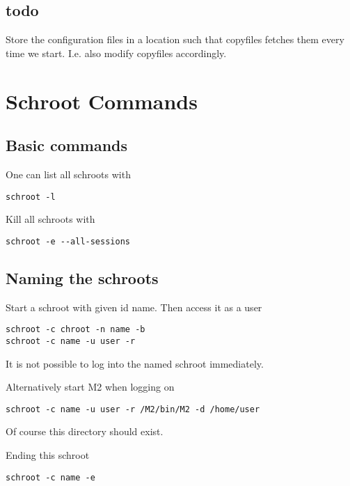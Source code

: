 \documentclass[a4paper]{book}
\begin{document}
\subsection{todo}

Store the configuration files in a location such that copyfiles fetches them
every time we start. I.e. also modify copyfiles accordingly.


\section{Schroot Commands}
\subsection{Basic commands}
One can list all schroots with

\begin{verbatim}
schroot -l
\end{verbatim}

Kill all schroots with

\begin{verbatim}
schroot -e --all-sessions
\end{verbatim}

\subsection{Naming the schroots}
Start a schroot with given id name. Then access it as a user

\begin{verbatim}
schroot -c chroot -n name -b
schroot -c name -u user -r
\end{verbatim}

It is not possible to log into the named schroot immediately.

Alternatively start M2 when logging on

\begin{verbatim}
schroot -c name -u user -r /M2/bin/M2 -d /home/user 
\end{verbatim}

Of course this directory should exist.

Ending this schroot
\begin{verbatim}
schroot -c name -e
\end{verbatim}
\end{document}
